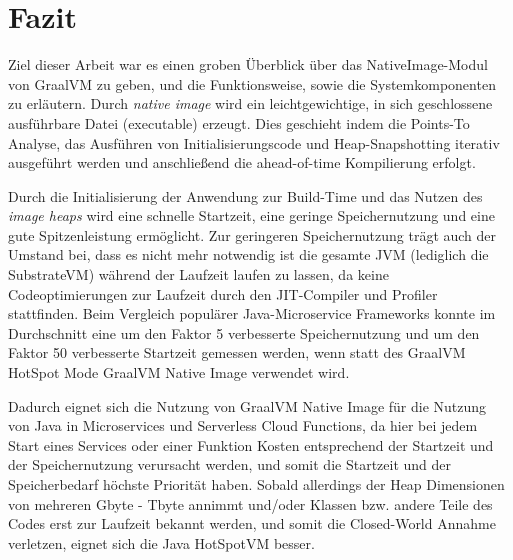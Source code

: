 \section{Fazit}
\label{sec:fazit}

Ziel dieser Arbeit war es einen groben Überblick über das NativeImage-Modul von GraalVM zu geben, und die Funktionsweise, sowie die Systemkomponenten zu erläutern. 
Durch \textit{native image} wird ein leichtgewichtige, in sich geschlossene ausführbare Datei (executable) erzeugt. Dies geschieht indem die Points-To Analyse, das Ausführen
von Initialisierungscode und Heap-Snapshotting iterativ ausgeführt werden und anschließend die ahead-of-time Kompilierung erfolgt.

Durch die Initialisierung der Anwendung zur Build-Time und das Nutzen des \textit{image heaps} wird eine schnelle Startzeit, eine geringe Speichernutzung und eine gute Spitzenleistung
ermöglicht.  Zur geringeren Speichernutzung trägt auch der Umstand bei, dass es nicht mehr notwendig ist die gesamte JVM (lediglich die SubstrateVM) während der Laufzeit laufen zu lassen,
 da keine Codeoptimierungen zur Laufzeit durch den JIT-Compiler und Profiler stattfinden. Beim Vergleich populärer Java-Microservice Frameworks konnte im Durchschnitt eine um den Faktor 5 verbesserte Speichernutzung
und um den Faktor 50 verbesserte Startzeit gemessen werden, wenn statt des GraalVM HotSpot Mode GraalVM Native Image verwendet wird.

Dadurch eignet sich die Nutzung von GraalVM Native Image für die Nutzung von Java in Microservices und Serverless Cloud Functions, da hier bei jedem Start eines Services oder einer Funktion 
Kosten entsprechend der Startzeit und der Speichernutzung verursacht werden, und somit die Startzeit und der Speicherbedarf höchste Priorität haben. 
Sobald allerdings der Heap Dimensionen von mehreren Gbyte - Tbyte annimmt und/oder Klassen bzw. andere Teile des Codes erst zur Laufzeit bekannt werden, und somit die Closed-World Annahme verletzen,
 eignet sich die Java HotSpotVM besser. 
